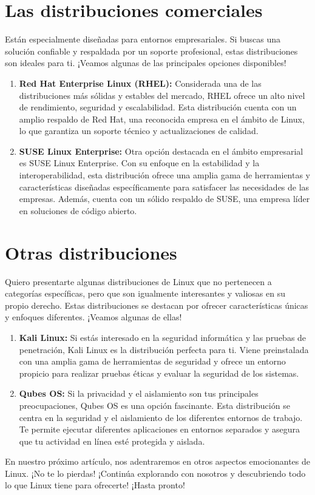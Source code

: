 \documentclass[
  letterpaper,
  DIV=11,
  numbers=noendperiod]{scrartcl}
\begin{document}
\hypertarget{las-distribuciones-comerciales}{%
\section{Las distribuciones
comerciales}\label{las-distribuciones-comerciales}}

Están especialmente diseñadas para entornos empresariales. Si buscas una
solución confiable y respaldada por un soporte profesional, estas
distribuciones son ideales para ti. ¡Veamos algunas de las principales
opciones disponibles!

\begin{enumerate}
\def\labelenumi{\arabic{enumi}.}
\item
  \textbf{Red Hat Enterprise Linux (RHEL):} Considerada una de las
  distribuciones más sólidas y estables del mercado, RHEL ofrece un alto
  nivel de rendimiento, seguridad y escalabilidad. Esta distribución
  cuenta con un amplio respaldo de Red Hat, una reconocida empresa en el
  ámbito de Linux, lo que garantiza un soporte técnico y actualizaciones
  de calidad.
\item
  \textbf{SUSE Linux Enterprise:} Otra opción destacada en el ámbito
  empresarial es SUSE Linux Enterprise. Con su enfoque en la estabilidad
  y la interoperabilidad, esta distribución ofrece una amplia gama de
  herramientas y características diseñadas específicamente para
  satisfacer las necesidades de las empresas. Además, cuenta con un
  sólido respaldo de SUSE, una empresa líder en soluciones de código
  abierto.
\end{enumerate}

\hypertarget{otras-distribuciones}{%
\section{Otras distribuciones}\label{otras-distribuciones}}

Quiero presentarte algunas distribuciones de Linux que no pertenecen a
categorías específicas, pero que son igualmente interesantes y valiosas
en su propio derecho. Estas distribuciones se destacan por ofrecer
características únicas y enfoques diferentes. ¡Veamos algunas de ellas!

\begin{enumerate}
\def\labelenumi{\arabic{enumi}.}
\item
  \textbf{Kali Linux:} Si estás interesado en la seguridad informática y
  las pruebas de penetración, Kali Linux es la distribución perfecta
  para ti. Viene preinstalada con una amplia gama de herramientas de
  seguridad y ofrece un entorno propicio para realizar pruebas éticas y
  evaluar la seguridad de los sistemas.
\item
  \textbf{Qubes OS:} Si la privacidad y el aislamiento son tus
  principales preocupaciones, Qubes OS es una opción fascinante. Esta
  distribución se centra en la seguridad y el aislamiento de los
  diferentes entornos de trabajo. Te permite ejecutar diferentes
  aplicaciones en entornos separados y asegura que tu actividad en línea
  esté protegida y aislada.
\end{enumerate}

En nuestro próximo artículo, nos adentraremos en otros aspectos
emocionantes de Linux. ¡No te lo pierdas! ¡Continúa explorando con
nosotros y descubriendo todo lo que Linux tiene para ofrecerte! ¡Hasta
pronto!


\printbibliography
\end{document}

